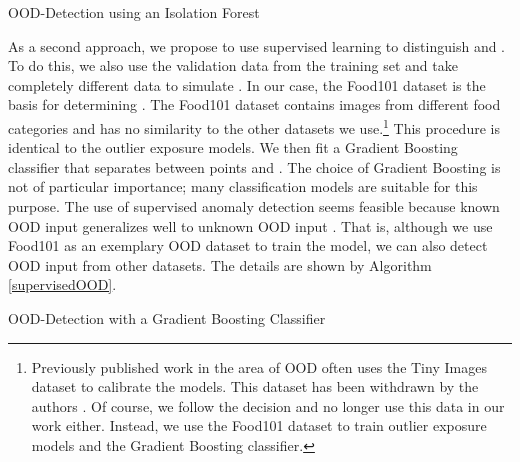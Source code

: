 \documentclass{article}
\begin{document}
\begin{algorithm}
\SetAlgoLined
{}
 
 \caption{OOD-Detection using an Isolation Forest}
 \label{algoSingleForest}
\end{algorithm}

As a second approach, we propose to use supervised learning to distinguish  and . To do this, we also use the validation data from the training set and take completely different data to simulate . In our case, the Food101 dataset \cite{LukasBossard.2014} is the basis for determining . The Food101 dataset contains images from different food categories and has no similarity to the other datasets we use.\footnote{Previously published work in the area of OOD often uses the Tiny Images dataset \cite{Torralba.2008} to calibrate the models. This dataset has been withdrawn by the authors \cite{withdrawTinyImages}. Of course, we follow the decision and no longer use this data in our work either. Instead, we use the Food101 \cite{LukasBossard.2014} dataset to train outlier exposure models and the Gradient Boosting classifier.} This procedure is identical to the outlier exposure models. We then fit a Gradient Boosting classifier that separates between points  and . The choice of Gradient Boosting is not of particular importance; many classification models are suitable for this purpose. The use of supervised anomaly detection seems feasible because known OOD input generalizes well to unknown OOD input \cite{Ruff.30.05.2020, Hendrycks.2018}. That is, although we use Food101 as an exemplary OOD dataset to train the model, we can also detect OOD input from other datasets. The details are shown by Algorithm \ref{supervisedOOD}.

\begin{algorithm}
\SetAlgoLined
{}
 
 \caption{OOD-Detection with a Gradient Boosting Classifier}
 \label{supervisedOOD}
\end{algorithm}
\end{document}
